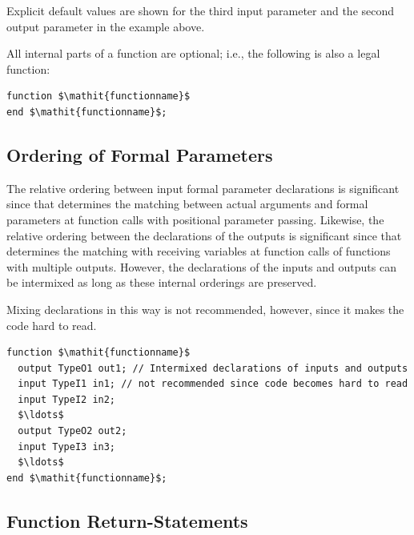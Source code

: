 \begin{nonnormative}
Explicit default values are shown for the third input parameter and the second output parameter in the example above.
\end{nonnormative}

\begin{nonnormative}
All internal parts of a function are optional; i.e., the following is also a legal function:
\begin{lstlisting}[language=modelica]
function $\mathit{functionname}$
end $\mathit{functionname}$;
\end{lstlisting}
\end{nonnormative}

\subsection{Ordering of Formal Parameters}\label{ordering-of-formal-parameters}

The relative ordering between input formal parameter declarations is significant since that determines the matching between actual arguments and formal parameters at function calls with positional parameter passing.
Likewise, the relative ordering between the declarations of the outputs is significant since that determines the matching with receiving variables at function calls of functions with multiple outputs.
However, the declarations of the inputs and outputs can be intermixed as long as these internal orderings are preserved.

\begin{nonnormative}
Mixing declarations in this way is not recommended, however, since it makes the code hard to read.
\end{nonnormative}

\begin{example}
\begin{lstlisting}[language=modelica]
function $\mathit{functionname}$
  output TypeO1 out1; // Intermixed declarations of inputs and outputs
  input TypeI1 in1; // not recommended since code becomes hard to read
  input TypeI2 in2;
  $\ldots$
  output TypeO2 out2;
  input TypeI3 in3;
  $\ldots$
end $\mathit{functionname}$;
\end{lstlisting}
\end{example}

\subsection{Function Return-Statements}\label{function-return-statements}


